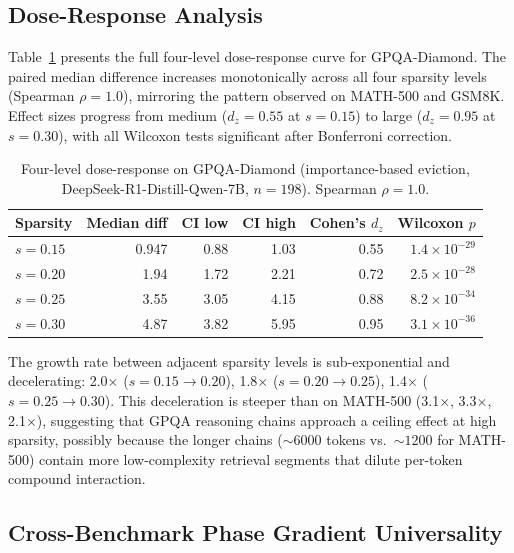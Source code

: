 \documentclass[11pt,a4paper]{article}
\begin{document}
\subsection{Dose-Response Analysis}\label{sec:dose-response}

Table~\ref{tab:dose-response} presents the full four-level dose-response curve for GPQA-Diamond. The paired median difference increases monotonically across all four sparsity levels (Spearman $\rho{=}1.0$), mirroring the pattern observed on MATH-500 and GSM8K. Effect sizes progress from medium ($d_z{=}0.55$ at $s{=}0.15$) to large ($d_z{=}0.95$ at $s{=}0.30$), with all Wilcoxon tests significant after Bonferroni correction.

\begin{table}[t]
\centering
\caption{Four-level dose-response on GPQA-Diamond (importance-based eviction, DeepSeek-R1-Distill-Qwen-7B, $n{=}198$). Spearman $\rho{=}1.0$.}
\label{tab:dose-response}
\small
\begin{tabular}{lrrrrr}
\toprule
Sparsity & Median diff & CI low & CI high & Cohen's $d_z$ & Wilcoxon $p$ \\
\midrule
$s{=}0.15$ & 0.947 & 0.88 & 1.03 & 0.55 & $1.4 \times 10^{-29}$ \\
$s{=}0.20$ & 1.94 & 1.72 & 2.21 & 0.72 & $2.5 \times 10^{-28}$ \\
$s{=}0.25$ & 3.55 & 3.05 & 4.15 & 0.88 & $8.2 \times 10^{-34}$ \\
$s{=}0.30$ & 4.87 & 3.82 & 5.95 & 0.95 & $3.1 \times 10^{-36}$ \\
\bottomrule
\end{tabular}
\end{table}

The growth rate between adjacent sparsity levels is sub-exponential and decelerating: 2.0$\times$ ($s{=}0.15 \to 0.20$), 1.8$\times$ ($s{=}0.20 \to 0.25$), 1.4$\times$ ($s{=}0.25 \to 0.30$). This deceleration is steeper than on MATH-500 (3.1$\times$, 3.3$\times$, 2.1$\times$), suggesting that GPQA reasoning chains approach a ceiling effect at high sparsity, possibly because the longer chains (${\sim}6000$ tokens vs.\ ${\sim}1200$ for MATH-500) contain more low-complexity retrieval segments that dilute per-token compound interaction.

\subsection{Cross-Benchmark Phase Gradient Universality}\label{sec:cross-benchmark}
\end{document}
